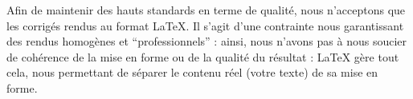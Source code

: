 ﻿Afin de maintenir des hauts standards en terme de qualité, nous n’acceptons que les corrigés rendus au format LaTeX. Il s’agit d’une contrainte nous garantissant des rendus homogènes et “professionnels” : ainsi, nous n’avons pas à nous soucier de cohérence de la mise en forme ou de la qualité du résultat : LaTeX gère tout cela, nous permettant de séparer le contenu réel (votre texte) de sa mise en forme.